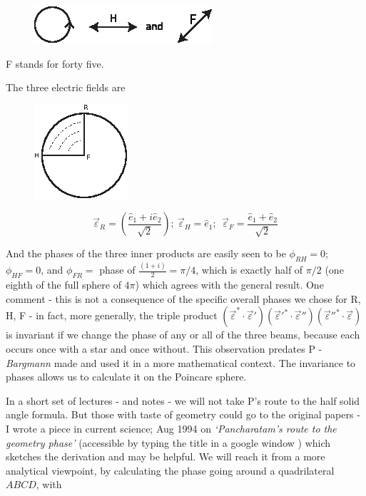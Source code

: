 \begin{figure}[H]
\centering
\includegraphics[scale=0.85]{src/images/chap26/10.jpg}
\end{figure}
F stands for forty five.

The three electric fields are
\bigskip

\begin{figure}[H]
\centering
\includegraphics[scale=1]{src/images/chap26/11.jpg}
\end{figure}
$$
\overrightarrow{\varepsilon}_R = \left(\frac{\hat{e}_1 + i \hat{e}_2}{\sqrt{2}} \right); ~ \overrightarrow{\varepsilon}_H = \hat{e}_1 ; ~~ \overrightarrow{\varepsilon}_F = \frac{\hat{e}_1  + \hat{e}_2}{\sqrt{2}}
$$

And the phases of the three inner products are easily seen to be $\phi_{RH} = 0$; $\phi_{HF} =0$, and $\phi_{FR} =$ phase of $\frac{(1+i)}{2} = \pi/4$, which is exactly half of $\pi/2$ (one eighth of the full sphere of $4\pi$) which agrees with the general result. One comment - this is not a consequence of the specific overall phases we chose for R, H, F - in fact, more generally, the triple product $(\overrightarrow{\varepsilon}^{\ast} \cdot \overrightarrow{\varepsilon}')(\overrightarrow{\varepsilon}'^{\ast} \cdot \overrightarrow{\varepsilon}'')(\overrightarrow{\varepsilon}''^{\ast} \cdot \overrightarrow{\varepsilon})$ is invariant if we change the phase of any or all of the three beams, because each occurs once with a star and once without. This observation predates P - \textit{Bargmann} made and used it in a more mathematical context. The invariance
to phases allows us to calculate it on the Poincare sphere.

In a short set of lectures - and notes - we will not take P’s route to the half
solid angle formula. But those with taste of geometry could go to the original
papers - I wrote a piece in current science; Aug 1994 on \textit{`Pancharatam's route
to the geometry phase'} (accessible by typing the title in a google window )
which sketches the derivation and may be helpful. We will reach it from a
more analytical viewpoint, by calculating the phase going around a quadrilateral
$ABCD$, with
\smallskip

